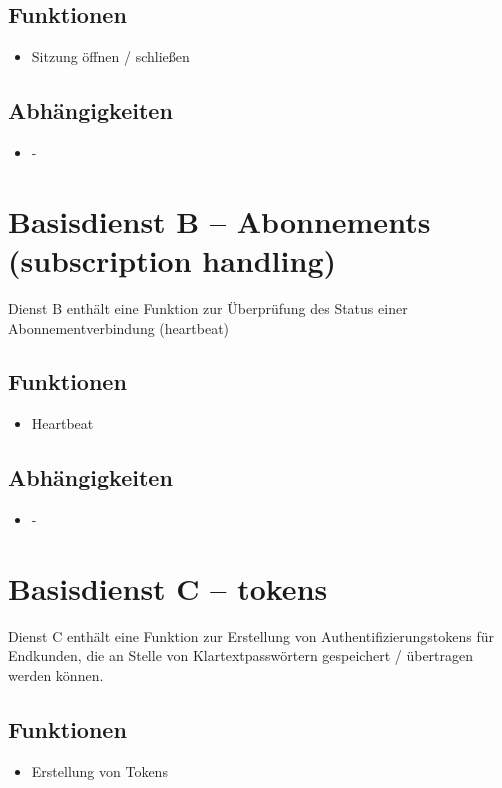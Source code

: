 \subsection*{Funktionen}
\begin{itemize}
\item Sitzung öffnen / schließen
\end{itemize}

\subsection*{Abhängigkeiten}
\begin{itemize}
\item -
\end{itemize}


\section{Basisdienst B -- Abonnements (subscription handling)}
\label{sec:Hierachiemodell:BasisdientB}
Dienst B enthält eine Funktion zur Überprüfung des Status einer Abonnementverbindung (heartbeat)

\subsection*{Funktionen}
\begin{itemize}
\item Heartbeat
\end{itemize}

\subsection*{Abhängigkeiten}
\begin{itemize}
\item -
\end{itemize}

\section{Basisdienst C -- tokens}
\label{sec:Hierachiemodell:BasisdientC}
Dienst C enthält eine Funktion zur Erstellung von Authentifizierungstokens für Endkunden, die an Stelle von Klartextpasswörtern gespeichert / übertragen werden können.

\subsection*{Funktionen}
\begin{itemize}
\item Erstellung von Tokens
\end{itemize}

